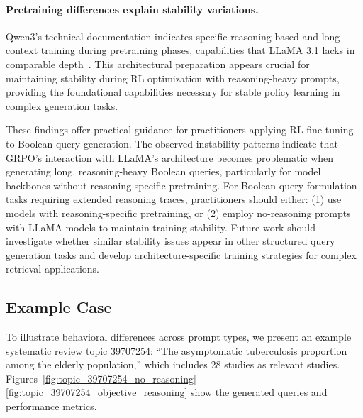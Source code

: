 \paragraph{Pretraining differences explain stability variations.} Qwen3's technical documentation indicates specific reasoning-based and long-context training during pretraining phases, capabilities that LLaMA 3.1 lacks in comparable depth~\cite{yang2025qwen3}. This architectural preparation appears crucial for maintaining stability during RL optimization with reasoning-heavy prompts, providing the foundational capabilities necessary for stable policy learning in complex generation tasks.

These findings offer practical guidance for practitioners applying RL fine-tuning to Boolean query generation. The observed instability patterns indicate that GRPO's interaction with LLaMA's architecture becomes problematic when generating long, reasoning-heavy Boolean queries, particularly for model backbones without reasoning-specific pretraining. For Boolean query formulation tasks requiring extended reasoning traces, practitioners should either: (1) use models with reasoning-specific pretraining, or (2) employ no-reasoning prompts with LLaMA models to maintain training stability. Future work should investigate whether similar stability issues appear in other structured query generation tasks and develop architecture-specific training strategies for complex retrieval applications.


\subsection{Example Case}
\label{appendix:example}

To illustrate behavioral differences across prompt types, we present an example systematic review topic 39707254: ``The asymptomatic tuberculosis proportion among the elderly population,'' which includes 28 studies as relevant studies. Figures~\ref{fig:topic_39707254_no_reasoning}--\ref{fig:topic_39707254_objective_reasoning} show the generated queries and performance metrics.

